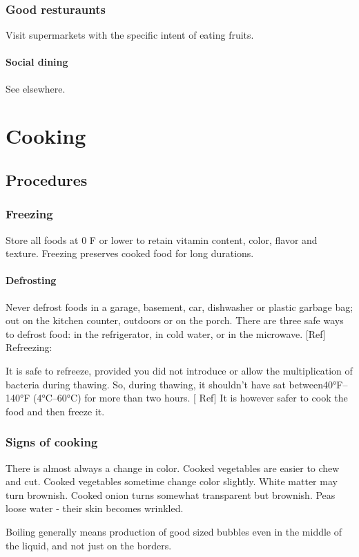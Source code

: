 \documentclass[oneside, article]{memoir}
\begin{document}
\section{Good resturaunts}
Visit supermarkets with the specific intent of eating fruits.

\subsection{Social dining}
See elsewhere.

\part{Cooking}
\chapter{Procedures}
\section{Freezing}
Store all foods at 0 F or lower to retain vitamin content, color, flavor and texture. Freezing preserves cooked food for long durations.

\subsection{Defrosting}
Never defrost foods in a garage, basement, car, dishwasher or plastic garbage bag; out on the kitchen counter, outdoors or on the porch. There are three safe ways to defrost food: in the refrigerator, in cold water, or in the microwave. [Ref]
Refreezing:

It is safe to refreeze, provided you did not introduce or allow the multiplication of bacteria during thawing. So, during thawing, it shouldn't have sat between40°F–140°F (4°C–60°C) for more than two hours. [ Ref] It is however safer to cook the food and then freeze it.

\section{Signs of cooking}

There is almost always a change in color. Cooked vegetables are easier to chew and cut. Cooked vegetables sometime change color slightly. White matter may turn brownish. Cooked onion turns somewhat transparent but brownish. Peas loose water - their skin becomes wrinkled.

Boiling generally means production of good sized bubbles even in the middle of the liquid, and not just on the borders.
\end{document}
